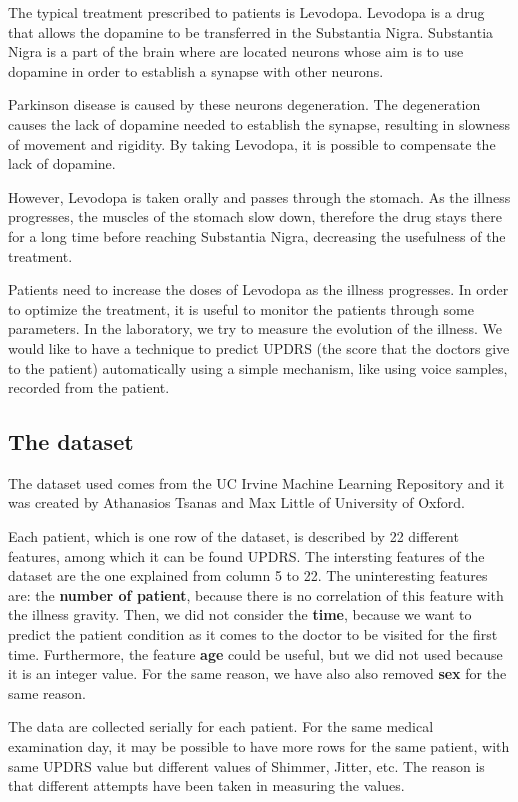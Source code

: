 \documentclass[12pt,a4paper,oneside]{article}
\begin{document}
	The typical treatment prescribed to patients is Levodopa. Levodopa is a drug that allows the dopamine to be transferred in the Substantia Nigra. Substantia Nigra is a part of the brain where are located neurons whose aim is to use dopamine in order to establish a synapse with other neurons.
	
	Parkinson disease is caused by these neurons degeneration. The degeneration causes the lack of dopamine needed to establish the synapse, resulting in slowness of movement and rigidity. By taking Levodopa, it is possible to compensate the lack of dopamine.
	
	However, Levodopa is taken orally and passes through the stomach. As the illness progresses, the muscles of the stomach slow down, therefore the drug stays there for a long time before reaching Substantia Nigra, decreasing the usefulness of the treatment.
	
	Patients need to increase the doses of Levodopa as the illness progresses. In order to optimize the treatment, it is useful to monitor the patients through some parameters. In the laboratory, we try to measure the evolution of the illness. We would like to have a technique to predict UPDRS (the score that the doctors give to the patient) automatically using a simple mechanism, like using voice samples, recorded from the patient.
	\subsection{The dataset}
	The dataset used comes from the UC Irvine Machine Learning Repository and it was created by Athanasios Tsanas and Max Little of University of Oxford.
	
	Each patient, which is one row of the dataset, is described by 22 different features, among which it can be found UPDRS. The intersting features of the dataset are the one explained from column 5 to 22. The uninteresting features are: the \textbf{number of patient}, because there is no correlation of this feature with the illness gravity. Then, we did not consider the \textbf{time}, because we want to predict the patient condition as it comes to the doctor to be visited for the first time. Furthermore, the feature \textbf{age} could be useful, but we did not used because it is an integer value. For the same reason, we have also also removed \textbf{sex} for the same reason.
	
	The data are collected serially for each patient. For the same medical examination day, it may be possible to have more rows for the same patient, with same UPDRS value but different values of Shimmer, Jitter, etc. The reason is that  different attempts have been taken in measuring the values.
	
\end{document}
